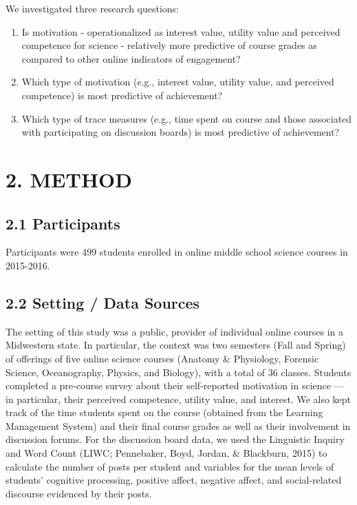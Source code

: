 \documentclass[,acmart]{apa6}
\providecommand{\tightlist}{%
  \setlength{\itemsep}{0pt}\setlength{\parskip}{0pt}}
\begin{document}
We investigated three research questions:

\begin{enumerate}
\def\labelenumi{\arabic{enumi}.}
\tightlist
\item
  Is motivation - operationalized as interest value, utility value and
  perceived competence for science - relatively more predictive of
  course grades as compared to other online indicators of engagement?
\item
  Which type of motivation (e.g., interest value, utility value, and
  perceived competence) is most predictive of achievement?
\item
  Which type of trace measures (e.g., time spent on course and those
  associated with participating on discussion boards) is most predictive
  of achievement?
\end{enumerate}

\section{2. METHOD}\label{method}

\subsection{2.1 Participants}\label{participants}

Participants were 499 students enrolled in online middle school science
courses in 2015-2016.

\subsection{2.2 Setting / Data Sources}\label{setting-data-sources}

The setting of this study was a public, provider of individual online
courses in a Midwestern state. In particular, the context was two
semesters (Fall and Spring) of offerings of five online science courses
(Anatomy \& Physiology, Forensic Science, Oceanography, Physics, and
Biology), with a total of 36 classes. Students completed a pre-course
survey about their self-reported motivation in science --- in
particular, their perceived competence, utility value, and interest. We
also kept track of the time students spent on the course (obtained from
the Learning Management System) and their final course grades as well as
their involvement in discussion forums. For the discussion board data,
we used the Linguistic Inquiry and Word Count (LIWC; Pennebaker, Boyd,
Jordan, \& Blackburn, 2015) to calculate the number of posts per student
and variables for the mean levels of students' cognitive processing,
positive affect, negative affect, and social-related discourse evidenced
by their posts.
\end{document}
